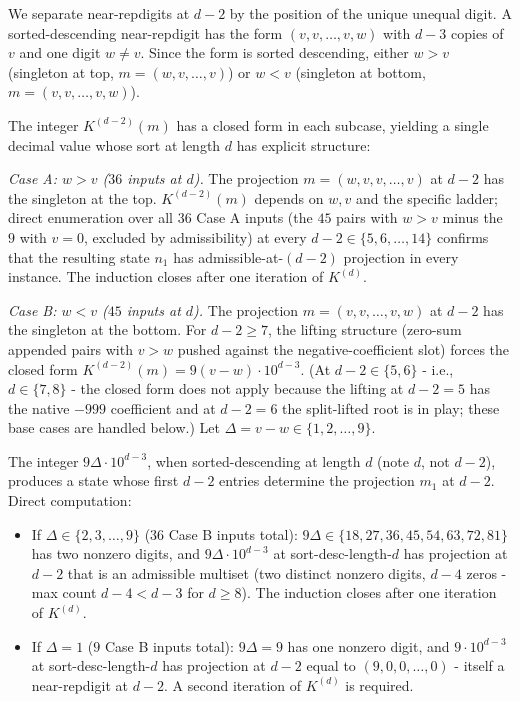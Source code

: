 \documentclass[11pt,letterpaper]{article}
\providecommand{\tightlist}{%
  \setlength{\itemsep}{0pt}\setlength{\parskip}{0pt}}
\theoremstyle{paperstyle}
\theoremstyle{paperstyledef}
\theoremstyle{paperstylerem}
\begin{document}
We separate near-repdigits at \(d - 2\) by the position of the unique
unequal digit. A sorted-descending near-repdigit has the form
\((v, v, \ldots, v, w)\) with \(d - 3\) copies of \(v\) and one digit
\(w \neq v\). Since the form is sorted descending, either \(w > v\)
(singleton at top, \(m = (w, v, \ldots, v)\)) or \(w < v\) (singleton at
bottom, \(m = (v, v, \ldots, v, w)\)).

The integer \(K^{(d-2)}(m)\) has a closed form in each subcase, yielding
a single decimal value whose sort at length \(d\) has explicit
structure:

\emph{Case A: \(w > v\) (\(36\) inputs at \(d\)).} The projection
\(m = (w, v, v, \ldots, v)\) at \(d - 2\) has the singleton at the top.
\(K^{(d-2)}(m)\) depends on \(w, v\) and the specific ladder; direct
enumeration over all \(36\) Case A inputs (the \(45\) pairs with
\(w > v\) minus the \(9\) with \(v = 0\), excluded by admissibility) at
every \(d - 2 \in \{5, 6, \ldots, 14\}\) confirms that the resulting
state \(n_1\) has admissible-at-\((d-2)\) projection in every instance.
The induction closes after one iteration of \(K^{(d)}\).

\emph{Case B: \(w < v\) (\(45\) inputs at \(d\)).} The projection
\(m = (v, v, \ldots, v, w)\) at \(d - 2\) has the singleton at the
bottom. For \(d - 2 \geq 7\), the lifting structure (zero-sum appended
pairs with \(v > w\) pushed against the negative-coefficient slot)
forces the closed form \(K^{(d-2)}(m) = 9 (v - w) \cdot 10^{d-3}\). (At
\(d - 2 \in \{5, 6\}\) - i.e., \(d \in \{7, 8\}\) - the closed form
does not apply because the lifting at \(d - 2 = 5\) has the native
\(-999\) coefficient and at \(d - 2 = 6\) the split-lifted root is in
play; these base cases are handled below.) Let
\(\Delta = v - w \in \{1, 2, \ldots, 9\}\).

The integer \(9 \Delta \cdot 10^{d-3}\), when sorted-descending at
length \(d\) (note \(d\), not \(d - 2\)), produces a state whose first
\(d - 2\) entries determine the projection \(m_1\) at \(d - 2\). Direct
computation:

\begin{itemize}
\tightlist
\item
  If \(\Delta \in \{2, 3, \ldots, 9\}\) (\(36\) Case B inputs total):
  \(9 \Delta \in \{18, 27, 36, 45, 54, 63, 72, 81\}\) has two nonzero
  digits, and \(9 \Delta \cdot 10^{d-3}\) at sort-desc-length-\(d\) has
  projection at \(d - 2\) that is an admissible multiset (two distinct
  nonzero digits, \(d - 4\) zeros - max count \(d - 4 < d - 3\) for
  \(d \geq 8\)). The induction closes after one iteration of
  \(K^{(d)}\).
\item
  If \(\Delta = 1\) (\(9\) Case B inputs total): \(9 \Delta = 9\) has
  one nonzero digit, and \(9 \cdot 10^{d-3}\) at sort-desc-length-\(d\)
  has projection at \(d - 2\) equal to \((9, 0, 0, \ldots, 0)\) -
  itself a near-repdigit at \(d - 2\). A second iteration of \(K^{(d)}\)
  is required.
\end{itemize}
\end{document}
